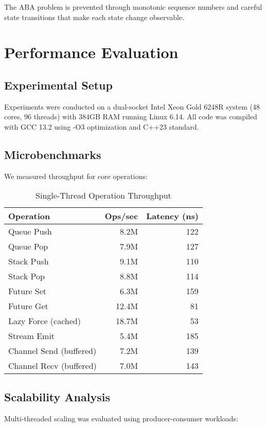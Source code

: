 \documentclass[10pt,conference]{IEEEtran}
\begin{document}
The ABA problem is prevented through monotonic sequence numbers and careful state transitions that make each state change observable.

\section{Performance Evaluation}

\subsection{Experimental Setup}

Experiments were conducted on a dual-socket Intel Xeon Gold 6248R system (48 cores, 96 threads) with 384GB RAM running Linux 6.14. All code was compiled with GCC 13.2 using -O3 optimization and C++23 standard.

\subsection{Microbenchmarks}

We measured throughput for core operations:

\begin{table}[h]
\centering
\caption{Single-Thread Operation Throughput}
\label{tab:throughput}
\begin{tabular}{lrr}
\toprule
Operation & Ops/sec & Latency (ns) \\
\midrule
Queue Push & 8.2M & 122 \\
Queue Pop & 7.9M & 127 \\
Stack Push & 9.1M & 110 \\
Stack Pop & 8.8M & 114 \\
Future Set & 6.3M & 159 \\
Future Get & 12.4M & 81 \\
Lazy Force (cached) & 18.7M & 53 \\
Stream Emit & 5.4M & 185 \\
Channel Send (buffered) & 7.2M & 139 \\
Channel Recv (buffered) & 7.0M & 143 \\
\bottomrule
\end{tabular}
\end{table}

\subsection{Scalability Analysis}

Multi-threaded scaling was evaluated using producer-consumer workloads:
\end{document}
